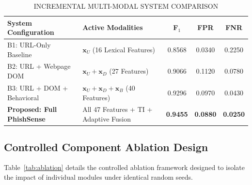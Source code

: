 \documentclass[conference]{IEEEtran}
\begin{document}
\begin{table}[!t]
\caption{INCREMENTAL MULTI-MODAL SYSTEM COMPARISON}
\label{tab:baseline}
\centering
\scriptsize
\setlength{\tabcolsep}{3pt}
\begin{tabularx}{\columnwidth}{|>{\raggedright\arraybackslash}p{}|>{\raggedright\arraybackslash}X|c|c|c|}
\hline
\textbf{System Configuration} & \textbf{Active Modalities} & \textbf{F$_1$} & \textbf{FPR} & \textbf{FNR} \\ \hline
B1: URL-Only Baseline        & $\mathbf{x}_U$ (16 Lexical Features) & 0.8568 & 0.0340 & 0.2250 \\ \hline
B2: URL + Webpage DOM        & $\mathbf{x}_U + \mathbf{x}_D$ (27 Features) & 0.9066 & 0.1120 & 0.0780 \\ \hline
B3: URL + DOM + Behavioral   & $\mathbf{x}_U + \mathbf{x}_D + \mathbf{x}_B$ (40 Features) & 0.9296 & 0.0970 & 0.0430 \\ \hline
\textbf{Proposed: Full PhishSense} & All 47 Features + TI + Adaptive Fusion & \textbf{0.9455} & \textbf{0.0880} & \textbf{0.0250} \\ \hline
\end{tabularx}
\end{table}

\subsection{Controlled Component Ablation Design}
Table~\ref{tab:ablation} details the controlled ablation framework designed to isolate the impact of
individual modules under identical random seeds.
\end{document}
